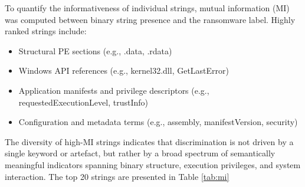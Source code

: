 \documentclass[conference]{IEEEtran}
\begin{document}
To quantify the informativeness of individual strings, mutual information (MI) was computed between binary string presence and the ransomware label. Highly ranked strings include:
\begin{itemize}
    \item Structural PE sections (e.g., .data, .rdata)
    \item Windows API references (e.g., kernel32.dll, GetLastError)
    \item Application manifests and privilege descriptors (e.g., requestedExecutionLevel, trustInfo)
    \item Configuration and metadata terms (e.g., assembly, manifestVersion, security)
\end{itemize}
The diversity of high-MI strings indicates that discrimination is not driven by a single keyword or artefact, but rather by a broad spectrum of semantically meaningful indicators spanning binary structure, execution privileges, and system interaction. The top 20 strings are presented in Table \ref{tab:mi}
\end{document}
